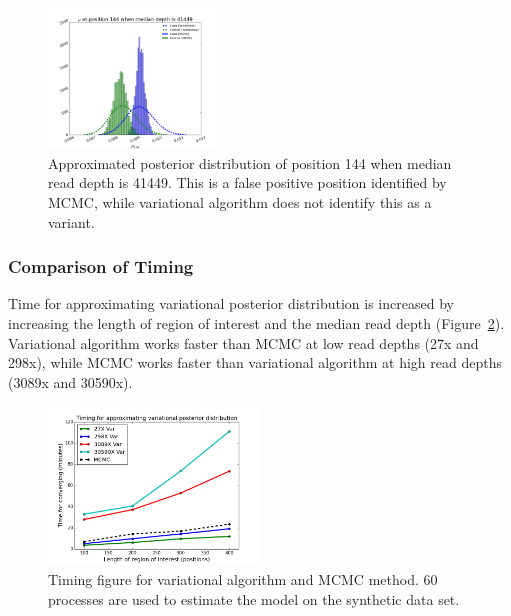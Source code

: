 \documentclass{article}
\begin{document}
\begin{figure}[!htbp]
\centering
\includegraphics[width=0.4\textwidth]{figs/position_144_41449_mcmc_vs_var_mu.png}
\caption{Approximated posterior distribution of position 144 when median read depth is 41449. This is a false positive position identified by MCMC, while variational algorithm does not identify this as a variant.}
\vspace{-10pt}
\label{tbl:posterior_mcmc_var_3}
\end{figure}

\subsubsection*{Comparison of Timing}
Time for approximating variational posterior distribution is increased by increasing the length of region of interest and the median read depth (Figure~\ref{tbl:timing_mcmc_var}).
Variational algorithm works faster than MCMC at low read depths (27x and 298x), while MCMC works faster than variational algorithm at high read depths (3089x and 30590x).

\begin{figure}[htbp]
\centering
\vspace{-10pt}
\includegraphics[width=0.5\textwidth]{tables/timing_var_mcmc.png}
\caption{Timing figure for variational algorithm and MCMC method.
60 processes are used to estimate the model on the synthetic data set.}
\vspace{-10pt}
\label{tbl:timing_mcmc_var}
\end{figure}
\end{document}
